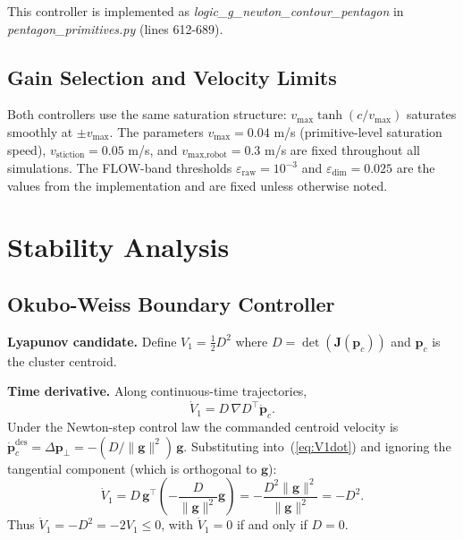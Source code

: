 \documentclass[lettersize,journal]{IEEEtran}
\begin{document}
\vspace{4pt}

This controller is implemented as \textit{logic\_g\_newton\_contour\_pentagon}
in \textit{pentagon\_primitives.py} (lines 612-689).

\subsection{Gain Selection and Velocity Limits}

Both controllers use the same saturation structure: $v_{\max}\tanh(c /
v_{\max})$ saturates smoothly at $\pm v_{\max}$. The parameters
$v_{\max} = 0.04$ m/s (primitive-level saturation speed),
$v_{\text{stiction}} = 0.05$ m/s, and $v_{\text{max,robot}} = 0.3$ m/s
are fixed throughout all simulations. The FLOW-band thresholds
$\varepsilon_{\text{raw}} = 10^{-3}$ and $\varepsilon_{\text{dim}} = 0.025$
are the values from the implementation and are fixed unless otherwise noted.



\section{Stability Analysis}
\label{sec:stability}

\subsection{Okubo-Weiss Boundary Controller}
\label{sec:stab_ow}

\textbf{Lyapunov candidate.} Define $V_1 = \tfrac{1}{2} D^2$ where
$D = \det(\mathbf{J}(\mathbf{p}_c))$ and $\mathbf{p}_c$ is the cluster
centroid.

\textbf{Time derivative.} Along continuous-time trajectories,
\begin{equation}
    \dot{V}_1 = D \, \nabla D^\top \dot{\mathbf{p}}_c. \label{eq:V1dot}
\end{equation}
Under the Newton-step control law the commanded centroid velocity is
$\dot{\mathbf{p}}_c^{\text{des}} = \Delta\mathbf{p}_{\perp} = -(D /
\|\mathbf{g}\|^2)\,\mathbf{g}$. Substituting into~(\ref{eq:V1dot}) and
ignoring the tangential component (which is orthogonal to $\mathbf{g}$):
\begin{equation}
    \dot{V}_1 = D \, \mathbf{g}^\top \left(- \frac{D}{\|\mathbf{g}\|^2}
    \mathbf{g}\right) = -\frac{D^2 \|\mathbf{g}\|^2}{\|\mathbf{g}\|^2}
    = -D^2. \label{eq:V1dot_clean}
\end{equation}
Thus $\dot{V}_1 = -D^2 = -2V_1 \leq 0$, with $\dot{V}_1 = 0$ if and only if
$D = 0$.
\end{document}
